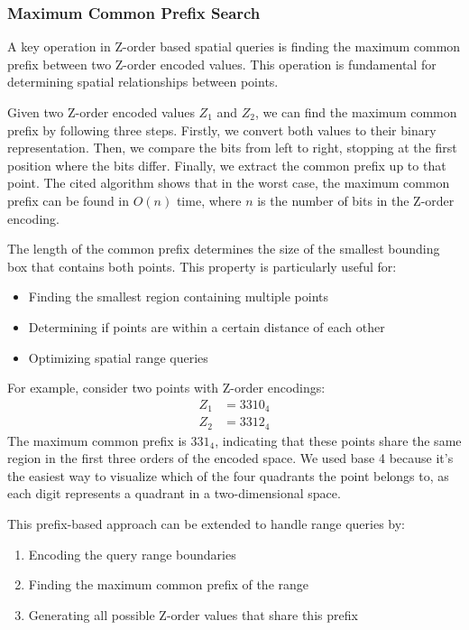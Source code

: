 \subsubsection{Maximum Common Prefix Search}
A key operation in Z-order based spatial queries is finding the maximum common prefix between two Z-order encoded values. This operation is fundamental for determining spatial relationships between points.

Given two Z-order encoded values \( Z_1 \) and \( Z_2 \), we can find the maximum common prefix by following three steps. Firstly, we convert both values to their binary representation. Then, we compare the bits from left to right, stopping at the first position where the bits differ. Finally, we extract the common prefix up to that point. The cited algorithm shows that in the worst case, the maximum common prefix can be found in \( O(n) \) time, where \( n \) is the number of bits in the Z-order encoding.

The length of the common prefix determines the size of the smallest bounding box that contains both points. This property is particularly useful for:
\begin{itemize}
    \item Finding the smallest region containing multiple points
    \item Determining if points are within a certain distance of each other
    \item Optimizing spatial range queries
\end{itemize}

For example, consider two points with Z-order encodings:
\begin{align*}
    Z_1 &= 3310_4 \\
    Z_2 &= 3312_4
\end{align*}
The maximum common prefix is \( 331_4 \), indicating that these points share the same region in the first three orders of the encoded space. We used base 4 because it's the easiest way to visualize which of the four quadrants the point belongs to, as each digit represents a quadrant in a two-dimensional space.

This prefix-based approach can be extended to handle range queries by:
\begin{enumerate}
    \item Encoding the query range boundaries
    \item Finding the maximum common prefix of the range
    \item Generating all possible Z-order values that share this prefix
\end{enumerate}

